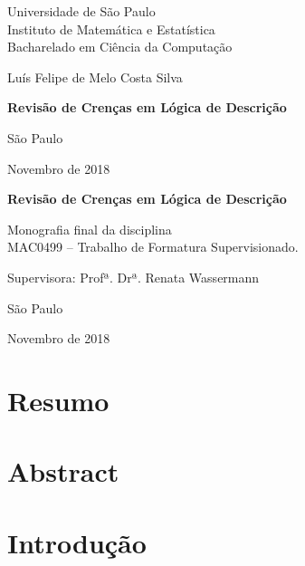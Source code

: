 \documentclass[12pt, a4paper]{report}
\begin{document}
	
	\thispagestyle{empty}
	\begin{center}
		\vspace*{2.3cm}
		Universidade de São Paulo\\
		Instituto de Matemática e Estatística\\
		Bacharelado em Ciência da Computação
		
		
		\vspace*{3cm}
		\Large{Luís Felipe de Melo Costa Silva}
		
		
		\vspace{3cm}
		\textbf{Revisão de Crenças em Lógica de Descrição}
		
		
		\vskip 5cm
		\normalsize{São Paulo}
		
		\normalsize{Novembro de 2018}
	\end{center}
	
	\newpage
	\thispagestyle{empty}
	\begin{center}
		\vspace*{2.3 cm}
		\textbf{\Large{Revisão de Crenças em Lógica de Descrição}}
		\vspace*{2 cm}
	\end{center}
	
	\vskip 2cm
	
	\begin{flushright}
		Monografia final da disciplina \\
		MAC0499 -- Trabalho de Formatura Supervisionado.
	\end{flushright}
	
	\vskip 5cm
	
	\begin{center}
		Supervisora: Profª. Drª. Renata Wassermann
		
		\vskip 5cm
		\normalsize{São Paulo}
		
		\normalsize{Novembro de 2018}
	\end{center}
	\pagebreak
	
	\chapter*{Resumo}
	\chapter*{Abstract}
	\chapter{Introdução}
	
\end{document}
